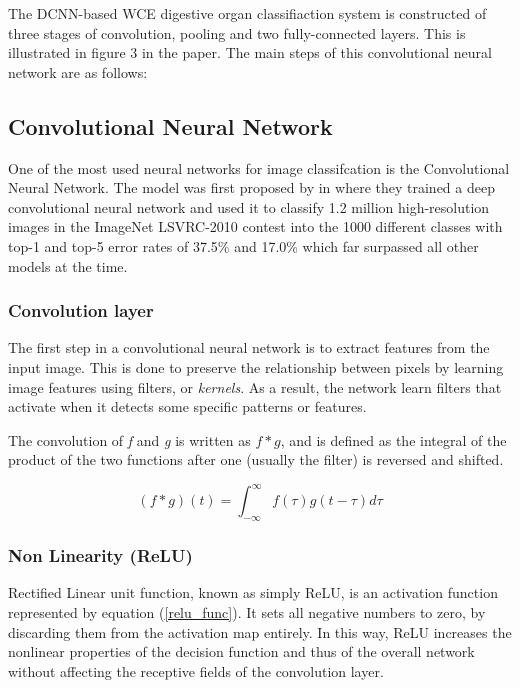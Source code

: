 \documentclass[english, a4paper]{report}
\begin{document}
The DCNN-based WCE digestive organ classifiaction system is constructed of three stages of convolution, pooling and two fully-connected layers. This is illustrated in figure 3 in the paper. \cite{ClassifyingDigestive15} The main steps of this convolutional neural network are as follows:

\subsection{Convolutional Neural Network}
One of the most used neural networks for image classifcation is the Convolutional Neural Network. The model was first proposed by \citeauthor*{ImageNetClassification12} in \citeyear{ImageNetClassification12} \cite{ImageNetClassification12} where they trained a deep convolutional neural network and used it to classify 1.2 million high-resolution images in the ImageNet LSVRC-2010 contest into the 1000 different classes with top-1 and top-5 error rates of 37.5\% and 17.0\% which far surpassed all other models at the time.


\subsubsection{Convolution layer}
The first step in a convolutional neural network is to extract features from the input image. This is done to preserve the relationship between pixels by learning image features using filters, or \textit{kernels}. As a result, the network learn filters that activate when it detects some specific patterns or features.

The convolution of \textit{f} and \textit{g} is written as $f*g$, and is defined as the integral of the product of the two functions after one (usually the filter) is reversed and shifted.

\begin{equation} %
  (f*g)(t) = \int_{-\infty}^{\infty} f(\tau) g(t-\tau) d\tau
  \label{convolution_func}
\end{equation}


\subsubsection{Non Linearity (ReLU)}
Rectified Linear unit function, known as simply ReLU, is an activation function represented by equation (\ref{relu_func}). It sets all negative numbers to zero, by discarding them from the activation map entirely. In this way, ReLU increases the nonlinear properties of the decision function and thus of the overall network without affecting the receptive fields of the convolution layer.
\end{document}
